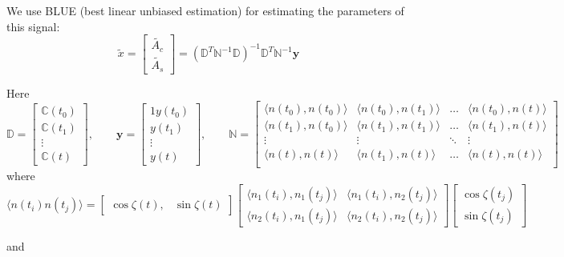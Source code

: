 \documentclass[notitlepage,a4paper,11pt,hyperref=pdftex]{revtex4-1}
\newcommand{\mean}[1]{\langle#1\rangle}
\begin{document}
We use BLUE (best linear unbiased estimation) for estimating the parameters of this signal:
\begin{equation}
 \tilde{x} =
\begin{bmatrix}
 \tilde{A_c}\\
\tilde{A_s}
\end{bmatrix}
= (\mathbb{D}^T\mathbb{N}^{-1}\mathbb{D})^{-1}\mathbb{D}^T\mathbb{N}^{-1}\mathbf{y}
\end{equation}

Here
\begin{equation}
 \mathbb{D} = 
\begin{bmatrix}
 \mathbb{C}(t_0) \\
 \mathbb{C}(t_1) \\
 \vdots\\
 \mathbb{C}(t)
\end{bmatrix},
\qquad
 \mathbf{y} = 
\begin{bmatrix}1
 y(t_0)\\
 y(t_1)\\
\vdots\\
y(t)
\end{bmatrix},
\qquad
 \mathbb{N} = 
\begin{bmatrix}
 \mean{n(t_0),n(t_0)} & \mean{n(t_0),n(t_1)} & \hdots & \mean{n(t_0),n(t)} \\
\mean{n(t_1),n(t_0)} & \mean{n(t_1),n(t_1)} & \hdots & \mean{n(t_1),n(t)} \\
\vdots & \vdots & \ddots & \vdots \\
\mean{n(t),n(t)} & \mean{n(t_1),n(t)} & \hdots & \mean{n(t),n(t)} \\
\end{bmatrix}
\end{equation}
where
\begin{equation}
 \mean{n(t_i)n(t_j)} = 
\begin{bmatrix}
 \cos\zeta(t), & \sin\zeta(t)
\end{bmatrix}
\begin{bmatrix}
 \mean{n_1(t_i),n_1(t_j)} & \mean{n_1(t_i),n_2(t_j)}\\
 \mean{n_2(t_i),n_1(t_j)} & \mean{n_2(t_i),n_2(t_j)}
\end{bmatrix}
\begin{bmatrix}
 \cos\zeta(t_j)\\ \sin\zeta(t_j)
\end{bmatrix}
\end{equation}

and
\end{document}
